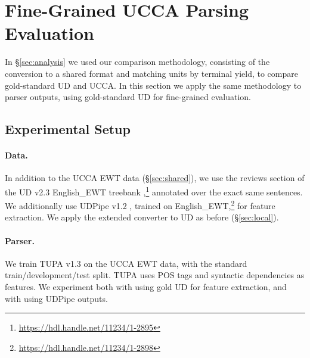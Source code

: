 \documentclass[11pt,a4paper,table]{article}
\begin{document}
\section{Fine-Grained UCCA Parsing Evaluation}\label{sec:fine_grained}

In \S\ref{sec:analysis} we used our comparison methodology,
consisting of the conversion to a shared format and matching units by terminal yield,
to compare gold-standard UD and UCCA.
In this section we apply the same methodology to parser outputs,
using gold-standard UD for fine-grained evaluation.

\subsection{Experimental Setup}\label{sec:experiments}

\paragraph{Data.}

In addition to the UCCA EWT data (\S\ref{sec:shared}),
we use the reviews section of the UD v2.3 English\_EWT treebank
\cite{11234/1-2895},\footnote{\url{https://hdl.handle.net/11234/1-2895}}
annotated over the exact same sentences.
We additionally use UDPipe v1.2 \cite{udpipe,udpipe:2017},
trained on
English\_EWT,\footnote{\url{https://hdl.handle.net/11234/1-2898}}
for feature extraction.
We apply the extended converter to UD as before (\S\ref{sec:local}).

\paragraph{Parser.}

We train TUPA v1.3 \cite{hershcovich2017a,hershcovich2018multitask}
on the UCCA EWT data, with the standard train/development/test split.
TUPA uses POS tags and syntactic dependencies as features.
We experiment both with using gold UD for feature extraction,
and with using UDPipe outputs.
\end{document}
